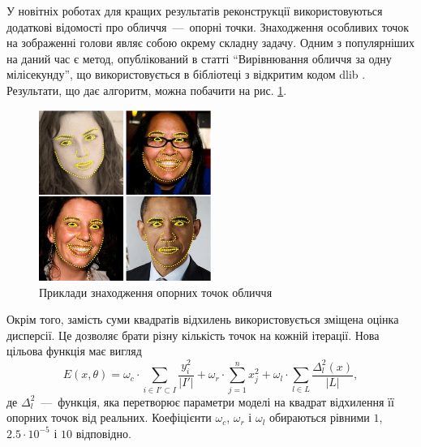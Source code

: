 У новітніх роботах для кращих результатів реконструкції використовуються
додаткові відомості про обличчя~---~опорні точки.
Знаходження особливих точок на зображенні голови
являє собою окрему складну задачу.
Одним з популярніших на даний час є метод, опублікований в статті
``Вирівнювання обличчя за одну мілісекунду'',
що використовується в бібліотеці з відкритим кодом dlib \cite{Kazemi:2014}.
Результати, що дає алгоритм, можна побачити на рис. \ref{fig:problems:dlib}.
\begin{figure}[h]
  \centering
    \includegraphics[width=0.5\textwidth]{images/dlib}
  \caption{Приклади знаходження опорних точок обличчя}
  \label{fig:problems:dlib}
\end{figure}

Окрім того,
замість суми квадратів відхилень використовується зміщена оцінка дисперсії.
Це дозволяє брати різну кількість точок на кожній ітерації.
Нова цільова функція має вигляд
\begin{equation}\label{eq:energy:face2face}
  E\left( x, \theta \right)
  = \omega_c \cdot \sum_{i \in I' \subset I} \frac{y_i^2}{\left| I' \right|}
  + \omega_r \cdot \sum_{j = 1}^{n} x_j^2
  + \omega_l \cdot \sum_{l \in L} \frac{\Delta_l^2\left( x \right)}
                                       {\left| L \right|},
\end{equation}
де $\Delta_l^2$~---~функція,
яка перетворює параметри моделі
на квадрат відхилення її опорних точок від реальних.
Коефіцієнти $\omega_c$, $\omega_r$ і $\omega_l$
обираються рівними $1$, $2.5 \cdot 10^{-5}$ і $10$ відповідно.
